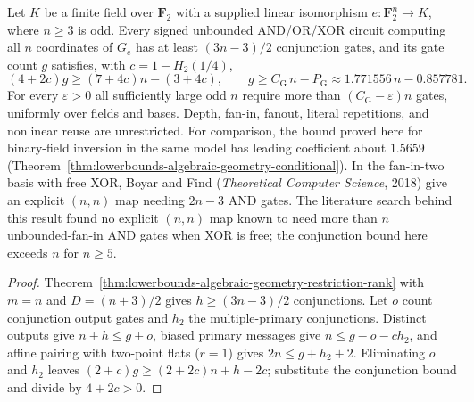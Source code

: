 \begin{theorem}
  \label{thm:lowerbounds-algebraic-geometry-gold}
  \leanok
  Let $K$ be a finite field over $\mathbf F_2$ with a supplied linear isomorphism
  $e:\mathbf F_2^n\longrightarrow K$, where $n\ge3$ is odd. Every signed unbounded
  AND/OR/XOR circuit computing all $n$ coordinates of $G_e$ has at least
  $(3n-3)/2$ conjunction gates, and its gate count $g$ satisfies, with
  $c=1-H_2(1/4)$,
  \[
    (4+2c)g\ge(7+4c)n-(3+4c),
    \qquad
    g\ge C_{\mathrm G}\,n-P_{\mathrm G}\approx1.771556\,n-0.857781.
  \]
  For every $\varepsilon>0$ all sufficiently large odd $n$ require more than
  $(C_{\mathrm G}-\varepsilon)n$ gates, uniformly over fields and bases.
  Depth, fan-in, fanout, literal repetitions, and nonlinear reuse are
  unrestricted. For comparison, the bound proved here for binary-field inversion
  in the same model has leading coefficient about $1.5659$
  (Theorem~\ref{thm:lowerbounds-algebraic-geometry-conditional}). In the fan-in-two
  basis with free XOR, Boyar and Find (\emph{Theoretical Computer Science}, 2018)
  give an explicit $(n,n)$ map needing $2n-3$ AND gates. The literature search
  behind this result found no explicit $(n,n)$ map known to need more than $n$
  unbounded-fan-in AND gates when XOR is free; the conjunction bound here exceeds
  $n$ for $n\ge5$.
\end{theorem}
\begin{proof}
  \leanok
  Theorem~\ref{thm:lowerbounds-algebraic-geometry-restriction-rank} with $m=n$ and
  $D=(n+3)/2$ gives $h\ge(3n-3)/2$ conjunctions. Let $o$ count conjunction output
  gates and $h_2$ the multiple-primary conjunctions. Distinct outputs give
  $n+h\le g+o$, biased primary messages give $n\le g-o-ch_2$, and affine pairing
  with two-point flats ($r=1$) gives $2n\le g+h_2+2$. Eliminating $o$ and $h_2$
  leaves $(2+c)g\ge(2+2c)n+h-2c$; substitute the conjunction bound and divide by
  $4+2c>0$.
\end{proof}

